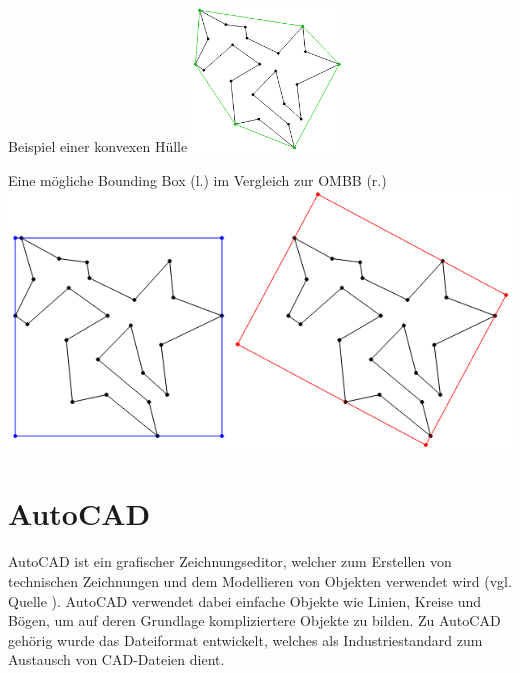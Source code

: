 \begin{Bild}{Beispiel einer konvexen Hülle}
	\includegraphics[width = 150px]{Bilder/convex_hull}
\end{Bild}
\begin{Bild}{Eine mögliche Bounding Box (l.) im Vergleich zur OMBB (r.)}
	\includegraphics[width = \textwidth]{Bilder/aabb_vs_ombb}
\end{Bild}

\section{AutoCAD}
AutoCAD ist ein grafischer Zeichnungseditor, welcher zum Erstellen von technischen Zeichnungen und dem Modellieren von Objekten verwendet wird (vgl. Quelle \cite{autocadwiki}).
AutoCAD verwendet dabei einfache Objekte wie Linien, Kreise und Bögen, um auf deren Grundlage kompliziertere Objekte zu bilden.
Zu AutoCAD gehörig wurde das Dateiformat  entwickelt, welches als Industriestandard zum Austausch von CAD-Dateien dient. \\

